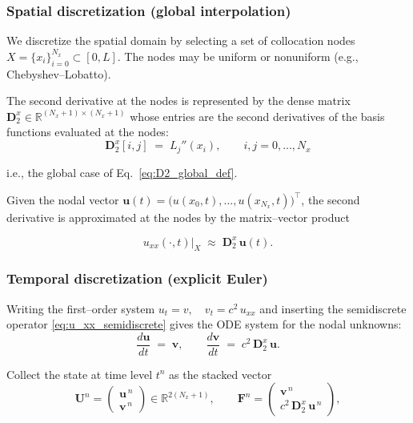 \subsubsection*{Spatial discretization (global interpolation)}
We discretize the spatial domain by selecting a set of collocation nodes
\(X=\{x_i\}_{i=0}^{N_x}\subset[0,L]\). The nodes may be uniform or nonuniform (e.g., Chebyshev–Lobatto).

The second derivative at the nodes is represented by the dense matrix \(\mathbf{D}_2^x\in\mathbb{R}^{(N_x+1)\times(N_x+1)}\) whose entries are the second derivatives of the basis functions evaluated at the nodes:
\begin{equation}
\mathbf{D}_2^x[i,j] \;=\; L_j''(x_i),\qquad i,j=0,\dots,N_x
\label{eq:D2x_def_wave}
\end{equation}

i.e., the global case of Eq.~\eqref{eq:D2_global_def}.

Given the nodal vector \(\mathbf{u}(t)=\big(u(x_0,t),\dots,u(x_{N_x},t)\big)^\top\),
the second derivative is approximated at the nodes by the matrix–vector product

\begin{equation}
u_{xx}(\cdot,t)\big|_{X}\;\approx\;\mathbf{D}_2^x\,\mathbf{u}(t).
\label{eq:u_xx_semidiscrete}
\end{equation}

\subsubsection*{Temporal discretization (explicit Euler)}
Writing the first–order system
\(
u_t=v,\quad v_t=c^2\,u_{xx}
\)
and inserting the semidiscrete operator \eqref{eq:u_xx_semidiscrete} gives the
ODE system for the nodal unknowns:
\begin{equation}
\frac{d\mathbf{u}}{dt} \;=\; \mathbf{v},\qquad
\frac{d\mathbf{v}}{dt} \;=\; c^2\,\mathbf{D}_2^x\,\mathbf{u}.
\label{eq:semi_discrete_ode}
\end{equation}

Collect the state at time level \(t^n\) as the stacked vector
\[
\mathbf{U}^{n}
=\begin{pmatrix}\mathbf{u}^{\,n}\\[0.25em]\mathbf{v}^{\,n}\end{pmatrix}
\in \mathbb{R}^{2(N_x+1)},
\qquad
\mathbf{F}^{n}
=\begin{pmatrix}\mathbf{v}^{\,n}\\[0.25em]c^2\,\mathbf{D}_2^x\,\mathbf{u}^{\,n}\end{pmatrix},
\]

